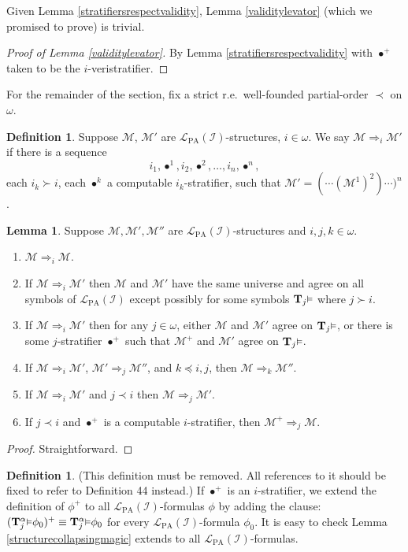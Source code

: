 \documentclass[reqno]{article}
\theoremstyle{definition}
\newtheorem{lemma}[theorem]{Lemma}
\newtheorem{definition}[theorem]{Definition}
\def\L{\mathscr{L}}
\def\M{\mathscr{M}}
\def\T{\mathbf{T}}
\def\LPA{\L_{\mathrm{PA}}}
\def\indset{\mathcal I}
\def\myequiv{\Rightarrow}
\renewcommand{\Pr}[1]{\T_{#1}\mbox{\small${\vDash}$}}
\newcommand{\Prr}[2]{\T^{#1}_{#2}\mbox{\small${\vDash}$}}
\begin{document}
Given Lemma \ref{stratifiersrespectvalidity}, Lemma \ref{validitylevator} (which we promised to prove)
is trivial.

\begin{proof}[Proof of Lemma \ref{validitylevator}]
By Lemma \ref{stratifiersrespectvalidity} with $\bullet^+$ taken to be the $i$-veristratifier.
\end{proof}

For the remainder of the section, fix a strict r.e.~well-founded partial-order $\prec$ on $\omega$.

\begin{definition}
\label{equividefn}
Suppose $\M$, $\M'$ are $\LPA(\indset)$-structures, $i\in\omega$.
We say $\M\myequiv_i\M'$ if
there is a sequence \[i_1,\bullet^1,i_2,\bullet^2,\ldots,i_n,\bullet^n,\]
each $i_k\succ i$, each $\bullet^k$ a computable $i_k$-stratifier,
such that $\M'=(\cdots(\M^1)^2)\cdots)^n$.
\end{definition}

\begin{lemma}
\label{sequencelemma}
Suppose $\M,\M',\M''$ are $\LPA(\indset)$-structures and $i,j,k\in\omega$.
\begin{enumerate}
\item
$\M\myequiv_i\M$.
\item
If $\M\myequiv_i\M'$ then $\M$ and $\M'$ have the same universe and agree
on all symbols of $\LPA(\indset)$ except possibly for some symbols $\Pr j$
where $j\succ i$.
\item
If $\M\myequiv_i\M'$ then for any $j\in\omega$, either $\M$ and $\M'$ agree on $\Pr j$,
or there is some $j$-stratifier $\bullet^+$ such that $\M^+$ and $\M'$ agree on $\Pr j$.
\item
If $\M\myequiv_i\M'$, $\M'\myequiv_j\M''$, and $k\preceq i,j$, then $\M\myequiv_k\M''$.
\item
If $\M\myequiv_i\M'$ and $j\prec i$ then $\M\myequiv_j\M'$.
\item
If $j\prec i$ and $\bullet^+$ is a computable $i$-stratifier,
then $\M^+\myequiv_j\M$.
\end{enumerate}
\end{lemma}

\begin{proof}
Straightforward.
\end{proof}

\begin{definition}
\label{magicpreserver}
(This definition must be removed.  All references to it should be fixed to refer
to Definition 44 instead.)
If $\bullet^+$ is an $i$-stratifier, we extend the definition of $\phi^+$
to all $\LPA(\indset)$-formulas $\phi$ 
by adding the clause: $(\Prr\alpha j\phi_0)^+\equiv\Prr\alpha j\phi_0$ for every $\LPA(\indset)$-formula $\phi_0$.
It is easy to check Lemma \ref{structurecollapsingmagic} extends to all $\LPA(\indset)$-formulas.
\end{definition}
\end{document}
